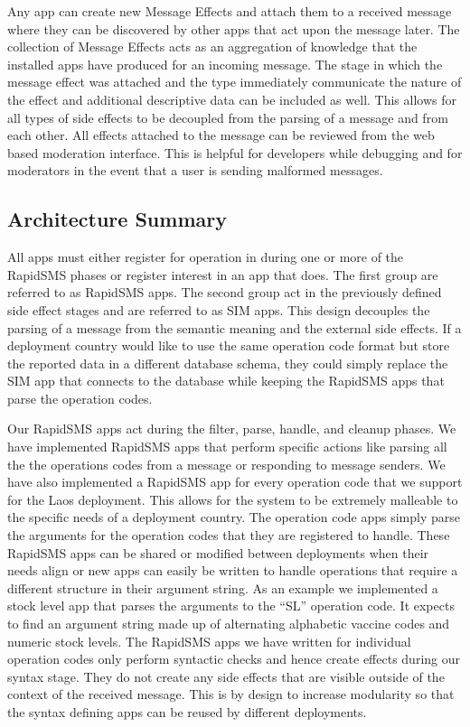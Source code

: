 \documentclass{acm_proc_article-sp}
\begin{document}
Any app can create new Message Effects and attach them to a received message where they can be discovered by other apps that act upon the message later. The collection of Message Effects acts as an aggregation of knowledge that the installed apps have produced for an incoming message. The stage in which the message effect was attached and the type immediately communicate the nature of the effect and additional descriptive data can be included as well. This allows for all types of side effects to be decoupled from the parsing of a message and from each other. All effects attached to the message can be reviewed from the web based moderation interface. This is helpful for developers while debugging and for moderators in the event that a user is sending malformed messages.

\subsection{Architecture Summary}

All apps must either register for operation in during one or more of the RapidSMS phases or register interest in an app that does. The first group are referred to as RapidSMS apps. The second group act in the previously defined side effect stages and are referred to as SIM apps. This design decouples the parsing of a message from the semantic meaning and the external side effects. If a deployment country would like to use the same operation code format but store the reported data in a different database schema, they could simply replace the SIM app that connects to the database while keeping the RapidSMS apps that parse the operation codes.

Our RapidSMS apps act during the filter, parse, handle, and cleanup phases. We have implemented RapidSMS apps that perform specific actions like parsing all the the operations codes from a message or responding to message senders. We have also implemented a RapidSMS app for every operation code that we support for the Laos deployment. This allows for the system to be extremely malleable to the specific needs of a deployment country. The operation code apps simply parse the arguments for the operation codes that they are registered to handle. These RapidSMS apps can be shared or modified between deployments when their needs align or new apps can easily be written to handle operations that require a different structure in their argument string. As an example we implemented a stock level app that parses the arguments to the ``SL'' operation code. It expects to find an argument string made up of alternating alphabetic vaccine codes and numeric stock levels. The RapidSMS apps we have written for individual operation codes only perform syntactic checks and hence create effects during our syntax stage. They do not create any side effects that are visible outside of the context of the received message. This is by design to increase modularity so that the syntax defining apps can be reused by different deployments.
 
\end{document}
